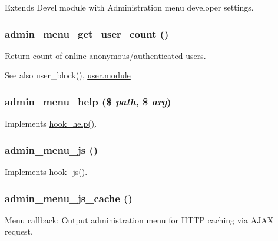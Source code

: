 Extends Devel module with Administration menu developer settings. \hypertarget{admin__menu_8module_ad3786315404a78da596963267f80282f}{
\subsubsection[{admin\_\-menu\_\-get\_\-user\_\-count}]{\setlength{\rightskip}{0pt plus 5cm}admin\_\-menu\_\-get\_\-user\_\-count ()}}
\label{admin__menu_8module_ad3786315404a78da596963267f80282f}
Return count of online anonymous/authenticated users.

\begin{DoxySeeAlso}{See also}
user\_\-block(), \hyperlink{user_8module}{user.module} 
\end{DoxySeeAlso}
\hypertarget{admin__menu_8module_ab8091736c23e24e82ac4954efd6b9a40}{
\subsubsection[{admin\_\-menu\_\-help}]{\setlength{\rightskip}{0pt plus 5cm}admin\_\-menu\_\-help (\$ {\em path}, \/  \$ {\em arg})}}
\label{admin__menu_8module_ab8091736c23e24e82ac4954efd6b9a40}
Implements \hyperlink{group__hooks_ga5589c2714a782738e8851c4c90231f0e}{hook\_\-help()}. \hypertarget{admin__menu_8module_ab95b2814fc91e5810e361f155416514f}{
\subsubsection[{admin\_\-menu\_\-js}]{\setlength{\rightskip}{0pt plus 5cm}admin\_\-menu\_\-js ()}}
\label{admin__menu_8module_ab95b2814fc91e5810e361f155416514f}
Implements hook\_\-js(). \hypertarget{admin__menu_8module_a199e7fc41af069dbf54a2e229cfec72b}{
\subsubsection[{admin\_\-menu\_\-js\_\-cache}]{\setlength{\rightskip}{0pt plus 5cm}admin\_\-menu\_\-js\_\-cache ()}}
\label{admin__menu_8module_a199e7fc41af069dbf54a2e229cfec72b}
Menu callback; Output administration menu for HTTP caching via AJAX request.

